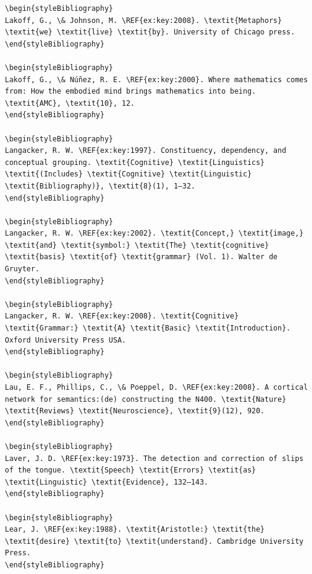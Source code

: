 \begin{verbatim}
\begin{styleBibliography}
Lakoff, G., \& Johnson, M. \REF{ex:key:2008}. \textit{Metaphors} \textit{we} \textit{live} \textit{by}. University of Chicago press.
\end{styleBibliography}

\begin{styleBibliography}
Lakoff, G., \& Núñez, R. E. \REF{ex:key:2000}. Where mathematics comes from: How the embodied mind brings mathematics into being. \textit{AMC}, \textit{10}, 12.
\end{styleBibliography}

\begin{styleBibliography}
Langacker, R. W. \REF{ex:key:1997}. Constituency, dependency, and conceptual grouping. \textit{Cognitive} \textit{Linguistics} \textit{(Includes} \textit{Cognitive} \textit{Linguistic} \textit{Bibliography)}, \textit{8}(1), 1–32.
\end{styleBibliography}

\begin{styleBibliography}
Langacker, R. W. \REF{ex:key:2002}. \textit{Concept,} \textit{image,} \textit{and} \textit{symbol:} \textit{The} \textit{cognitive} \textit{basis} \textit{of} \textit{grammar} (Vol. 1). Walter de Gruyter.
\end{styleBibliography}

\begin{styleBibliography}
Langacker, R. W. \REF{ex:key:2008}. \textit{Cognitive} \textit{Grammar:} \textit{A} \textit{Basic} \textit{Introduction}. Oxford University Press USA.
\end{styleBibliography}

\begin{styleBibliography}
Lau, E. F., Phillips, C., \& Poeppel, D. \REF{ex:key:2008}. A cortical network for semantics:(de) constructing the N400. \textit{Nature} \textit{Reviews} \textit{Neuroscience}, \textit{9}(12), 920.
\end{styleBibliography}

\begin{styleBibliography}
Laver, J. D. \REF{ex:key:1973}. The detection and correction of slips of the tongue. \textit{Speech} \textit{Errors} \textit{as} \textit{Linguistic} \textit{Evidence}, 132–143.
\end{styleBibliography}

\begin{styleBibliography}
Lear, J. \REF{ex:key:1988}. \textit{Aristotle:} \textit{the} \textit{desire} \textit{to} \textit{understand}. Cambridge University Press.
\end{styleBibliography}


\end{verbatim}

